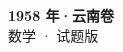 \documentclass[zihao=-4, a4paper]{ctexart}
\begin{document}
\begin{center}
  {\Large\bfseries 1958 年·云南卷}\\[4pt]
  {\large 数学 · 试题版}
\end{center}
\medskip
{}

\end{document}
